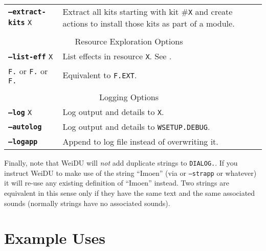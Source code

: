 \documentclass{article}
\def\ttref#1{\ahrefloc{#1}{\tt #1}}
\def\DEFINE#1{{\tt \bf #1}\label{#1}\index{#1}}
\def\t#1{{\tt #1}}
\begin{document}
\begin{tabular}{lp{10in}|p{10in}}
\DEFINE{--extract-kits} \t{X} & Extract all kits starting with kit \#\t{X}
and create \ttref{TP2} actions to install those kits as part of a module.  \\
\\
\multicolumn{2}{c}{ \color{red} Resource Exploration Options } \\
\DEFINE{--list-eff} \t{X}&	List effects in resource \t{X}. See
\ttref{--out}. \\
{\tt F.}\ttref{ITM} or
{\tt F.}\ttref{EFF} or
\tt{F.}\ttref{SPL} & Equivalent to \ttref{--list-eff} \t{F.EXT}. \\
\\
\multicolumn{2}{c}{ \color{red} Logging Options } \\
\DEFINE{--log} \t{X}&	Log output and details to \t{X}. \\
\DEFINE{--autolog} & 	Log output and details to \t{WSETUP.DEBUG}. \\
\DEFINE{--logapp} & 	Append to log file instead of overwriting it. \\
\end{tabular}

Finally, note that WeiDU will \emph{not} add duplicate strings to
\t{DIALOG.}\ttref{TLK}. If you instruct WeiDU to make use of the string
``Imoen'' (via \ttref{SAY} or \t{--strapp} or whatever) it will re-use any
existing definition of ``Imoen'' instead. Two strings are equivalent in
this sense only if they have the same text and the same associated sounds
(normally strings have no associated sounds).

\section{Example Uses}
\end{document}
